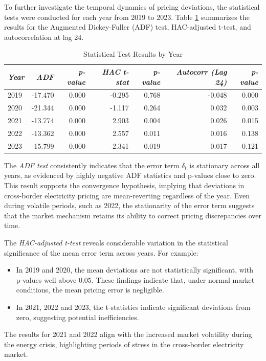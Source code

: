 \documentclass[12pt]{article}
\begin{document}
To further investigate the temporal dynamics of pricing deviations, the statistical tests were conducted for each year from 2019 to 2023. Table \ref{tab:yearly_test_results} summarizes the results for the Augmented Dickey-Fuller (ADF) test, HAC-adjusted t-test, and autocorrelation at lag 24.
\begin{table}[ht]
   \footnotesize
   \centering
   \caption{Statistical Test Results by Year}
   \label{tab:yearly_test_results}
   \begin{tabular}{l|rr|rr|rr}
       \hline
       \textit{Year} & \textit{ADF} & \textit{p-value} & \textit{HAC t-stat} & \textit{p-value} & \textit{Autocorr (Lag 24)} & \textit{p-value} \\
       \hline
       2019 & -17.470 & 0.000 & -0.295 & 0.768 & -0.048 & 0.000 \\
       2020 & -21.344 & 0.000 & -1.117 & 0.264 &  0.032 & 0.003 \\
       2021 & -13.774 & 0.000 &  2.903 & 0.004 &  0.026 & 0.015 \\
       2022 & -13.362 & 0.000 &  2.557 & 0.011 &  0.016 & 0.138 \\
       2023 & -15.799 & 0.000 & -2.341 & 0.019 &  0.017 & 0.121 \\
       \hline
   \end{tabular}
\end{table}


The \textit{ADF test} consistently indicates that the error term $\delta_t$ is stationary across all years, as evidenced by highly negative ADF statistics and p-values close to zero. This result supports the convergence hypothesis, implying that deviations in cross-border electricity pricing are mean-reverting regardless of the year. Even during volatile periods, such as 2022, the stationarity of the error term suggests that the market mechanism retains its ability to correct pricing discrepancies over time.

The \textit{HAC-adjusted t-test} reveals considerable variation in the statistical significance of the mean error term across years. For example:
\begin{itemize}
    \item In 2019 and 2020, the mean deviations are not statistically significant, with p-values well above $0.05$. These findings indicate that, under normal market conditions, the mean pricing error is negligible.
    \item In 2021, 2022 and 2023, the t-statistics indicate significant deviations from zero, suggesting potential inefficiencies.
\end{itemize}
The results for 2021 and 2022 align with the increased market volatility during the energy crisis, highlighting periods of stress in the cross-border electricity market.
\end{document}
